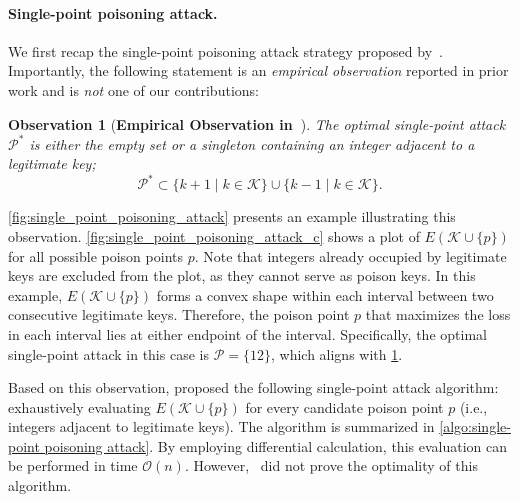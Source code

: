 \documentclass[acmsmall]{acmart}
\newtheorem{observation}{Observation}
\begin{document}
\paragraph{Single-point poisoning attack.}
We first recap the single-point poisoning attack strategy proposed by~\cite{kornaropoulos2022price}.
Importantly, the following statement is an \emph{empirical observation} reported in prior work and is \emph{not} one of our contributions:
\begin{theorem_box}
\begin{observation}[\textbf{Empirical Observation in~\cite{kornaropoulos2022price}}]
\label{observ:single_point_poisoning_attack}
The optimal single-point attack $\mathcal{P}^\ast$ is either the empty set or a singleton containing an integer adjacent to a legitimate key;
\begin{equation}
\mathcal{P}^\ast \subset \{k + 1 \mid k \in \mathcal{K}\} \cup \{k - 1 \mid k \in \mathcal{K}\}.
\end{equation}
\end{observation}
\end{theorem_box}
\cref{fig:single_point_poisoning_attack} presents an example illustrating this observation.
\cref{fig:single_point_poisoning_attack_c} shows a plot of $E(\mathcal{K} \cup \{p\})$ for all possible poison points $p$.
Note that integers already occupied by legitimate keys are excluded from the plot, as they cannot serve as poison keys.
In this example, $E(\mathcal{K} \cup \{p\})$ forms a convex shape within each interval between two consecutive legitimate keys.
Therefore, the poison point $p$ that maximizes the loss in each interval lies at either endpoint of the interval.
Specifically, the optimal single-point attack in this case is $\mathcal{P} = \{12\}$, which aligns with \cref{observ:single_point_poisoning_attack}.

Based on this observation, \cite{kornaropoulos2022price} proposed the following single-point attack algorithm: exhaustively evaluating $E(\mathcal{K} \cup \{p\})$ for every candidate poison point $p$ (i.e., integers adjacent to legitimate keys).
The algorithm is summarized in \cref{algo:single-point poisoning attack}.
By employing differential calculation, this evaluation can be performed in time $\mathcal{O}(n)$.
However,~\cite{kornaropoulos2022price} did not prove the optimality of this algorithm.
\end{document}
